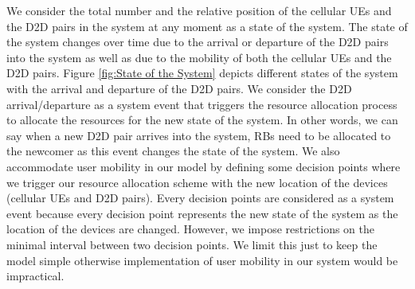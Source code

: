 \documentclass[times]{dacauth}
\begin{document}
\noindent
We consider the total number and the relative position of the cellular UEs and the D2D pairs in the system at any moment as a state of the system. The state of the system changes over time due to the arrival or departure of the D2D pairs into the system as well as due to the mobility of both the cellular UEs and the D2D pairs. Figure \ref{fig:State of the System} depicts different states of the system with the arrival and departure of the D2D pairs. We consider the D2D arrival/departure as a system event that triggers the resource allocation process to allocate the resources for the new state of the system. In other words, we can say when a new D2D pair arrives into the system, RBs need to be allocated to the newcomer as this event changes the state of the system. We also accommodate user mobility in our model by defining some decision points where we trigger our resource allocation scheme with the new location of the devices (cellular UEs and D2D pairs). Every decision points are considered as a system event because every decision point represents the new state of the system as the location of the devices are changed. However, we impose restrictions on the minimal interval between two decision points. We limit this just to keep the model simple otherwise implementation of user mobility in our system would be impractical.
\end{document}
